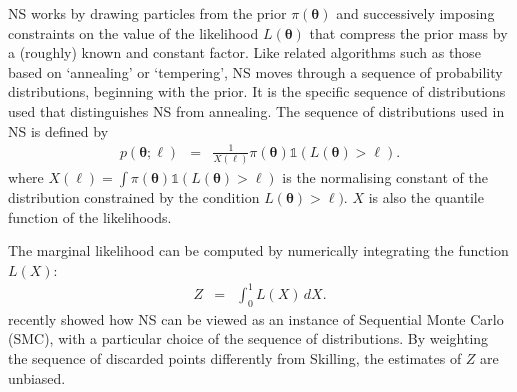 \documentclass[entropy,article,submit,moreauthors,pdftex,10pt,a4paper]{Definitions/mdpi}
\newcommand{\xx}{\boldsymbol{\theta}}
\begin{document}
NS works by drawing particles from the
prior $\pi(\xx)$ and successively imposing constraints on the value of
the likelihood $L(\xx)$ that compress the prior mass by a (roughly) known
and constant factor. Like related algorithms such as those
based on `annealing' or `tempering', NS
moves through a sequence of probability distributions, beginning with the
prior. It is the specific sequence of distributions used that distinguishes
NS from annealing. The sequence of distributions used in NS is defined by
\begin{eqnarray}
p(\xx; \ell) &=& \frac{1}{X(\ell)}\pi(\xx)\mathds{1}\left(L(\xx) > \ell\right).
\label{eq:constrained_prior}
\end{eqnarray}
where $X(\ell) = \int \pi(\xx)\mathds{1}\left(L(\xx) > \ell\right)$ is the
normalising constant of the distribution constrained by the condition
$L(\xx) > \ell)$. $X$ is also the quantile function of the likelihoods.

The marginal likelihood can be computed by numerically integrating the
function $L(X)$:
\begin{eqnarray}
Z &=& \int_0^1 L(X)\, dX.
\end{eqnarray}
\citet{salomone2018unbiased}
recently showed how NS can be viewed as an instance of
Sequential Monte Carlo (SMC), with a particular choice of the sequence of
distributions. By weighting the sequence of discarded points differently from
Skilling, the estimates of $Z$ are unbiased.

\end{document}
